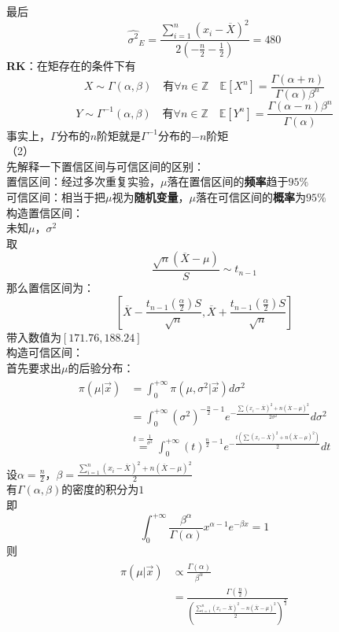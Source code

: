 \documentclass[12pt]{article}
\begin{document}
最后
\[
\hat{\sigma^2}_{E}=\frac{\sum\limits_{i=1}^{n} (x_i-\overline{X})^2}{2(-\frac{n}{2}-\frac{1}{2})}=480
\]
\textbf{RK}：在矩存在的条件下有\\
\[
X \sim \Gamma(\alpha,\beta) \quad \text{有} \forall n \in \mathbb{Z} \quad \mathbb{E}[X^n]=\frac{\Gamma(\alpha+n)}{\Gamma(\alpha)\beta^n}
\]
\[
Y \sim \Gamma^{-1}(\alpha,\beta) \quad \text{有} \forall n \in \mathbb{Z} \quad \mathbb{E}[Y^n]=\frac{\Gamma(\alpha-n)\beta^n}{\Gamma(\alpha)}
\]
事实上，$\Gamma$分布的$n$阶矩就是$\Gamma^{-1}$分布的$-n$阶矩\\
（2）\\
先解释一下置信区间与可信区间的区别：\\
置信区间：经过多次重复实验，$\mu$落在置信区间的\textbf{频率}趋于$95\%$\\
可信区间：相当于把$\mu$视为\textbf{随机变量}，$\mu$落在可信区间的\textbf{概率}为$95\%$\\
构造置信区间：\\
未知$\mu$，$\sigma^2$\\
取\\
\[
\frac{\sqrt{n}(\overline{X}-\mu)}{S} \sim t_{n-1}
\]
那么置信区间为：
\[
[\overline{X}-\frac{t_{n-1}(\frac{\alpha}{2})S}{\sqrt{n}},\overline{X}+\frac{t_{n-1}(\frac{\alpha}{2})S}{\sqrt{n}}]
\]
带入数值为$[171.76,188.24]$\\
构造可信区间：\\
首先要求出$\mu$的后验分布：\\
\begin{gather}
	\begin{aligned}
		\pi(\mu|\vec{x})&=\int_{0}^{+\infty} \pi(\mu,\sigma^2|\vec{x})d\sigma^2\\
		&=\int_{0}^{+\infty}(\sigma^2)^{-\frac{n}{2}-1}e^{-\frac{\sum (x_i-\overline{X})^2 +n(\overline{X}-\mu)^2}{2\sigma^2}}d\sigma^2\\
		&\overset{t=\frac{1}{\sigma^2}}=\int_{0}^{+\infty}(t)^{\frac{n}{2}-1}e^{-\frac{t(\sum (x_i-\overline{X})^2 +n(\overline{X}-\mu)^2)}{2}}dt
	\end{aligned}
\end{gather}
设$\alpha=\frac{n}{2}$，$\beta=\frac{\sum_{i=1}^n (x_i-\overline{X})^2 +n(\overline{X}-\mu)^2}{2}$\\
有$\Gamma(\alpha,\beta)$的密度的积分为$1$\\
即\\
\[
\int_{0}^{+\infty}\frac{\beta^{\alpha}}{\Gamma(\alpha)}x^{\alpha-1}e^{-\beta x}=1
\]
则
\begin{gather}
	\begin{aligned}
		\pi(\mu|\vec{x}) & \propto \frac{\Gamma(\alpha)}{\beta^{\alpha}}\\
		&=\frac{\Gamma(\frac{n}{2})}{(\frac{\sum_{i=1}^n  (x_i-\overline{X})^2-n(\overline{X}-\mu)^2}{2})^{\frac{n}{2}}}
	\end{aligned}
\end{gather}
\end{document}
